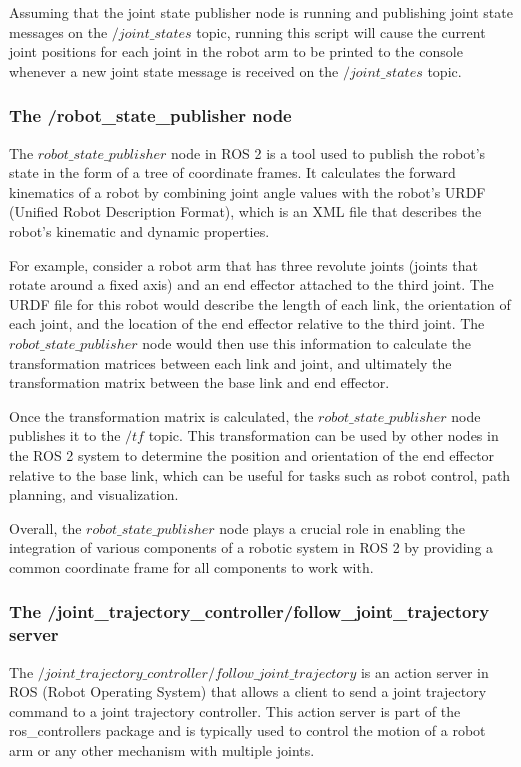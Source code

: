 \documentclass[12pt,oneside]{article}
\begin{document}
Assuming that the joint state publisher node is running and publishing joint state messages on the $/joint\_states$ topic, running this script will cause the current joint positions for each joint in the robot arm to be printed to the console whenever a new joint state message is received on the $/joint\_states$ topic.

\subsubsection{The /robot\_state\_publisher node}\label{ros2-robot-state-publisher}
The $robot\_state\_publisher$ node in ROS 2 is a tool used to publish the robot's state in the form of a tree of coordinate frames. It calculates the forward kinematics of a robot by combining joint angle values with the robot's URDF (Unified Robot Description Format), which is an XML file that describes the robot's kinematic and dynamic properties. 

For example, consider a robot arm that has three revolute joints (joints that rotate around a fixed axis) and an end effector attached to the third joint. The URDF file for this robot would describe the length of each link, the orientation of each joint, and the location of the end effector relative to the third joint. The $robot\_state\_publisher$ node would then use this information to calculate the transformation matrices between each link and joint, and ultimately the transformation matrix between the base link and end effector.

Once the transformation matrix is calculated, the $robot\_state\_publisher$ node publishes it to the $/tf$ topic. This transformation can be used by other nodes in the ROS 2 system to determine the position and orientation of the end effector relative to the base link, which can be useful for tasks such as robot control, path planning, and visualization.

Overall, the $robot\_state\_publisher$ node plays a crucial role in enabling the integration of various components of a robotic system in ROS 2 by providing a common coordinate frame for all components to work with.

\subsubsection{The /joint\_trajectory\_controller/follow\_joint\_trajectory server}\label{ros2-joint-trajectory-controller}
The $/joint\_trajectory\_controller/follow\_joint\_trajectory$ is an action server in ROS (Robot Operating System) that allows a client to send a joint trajectory command to a joint trajectory controller. This action server is part of the ros\_controllers package and is typically used to control the motion of a robot arm or any other mechanism with multiple joints.
\end{document}
